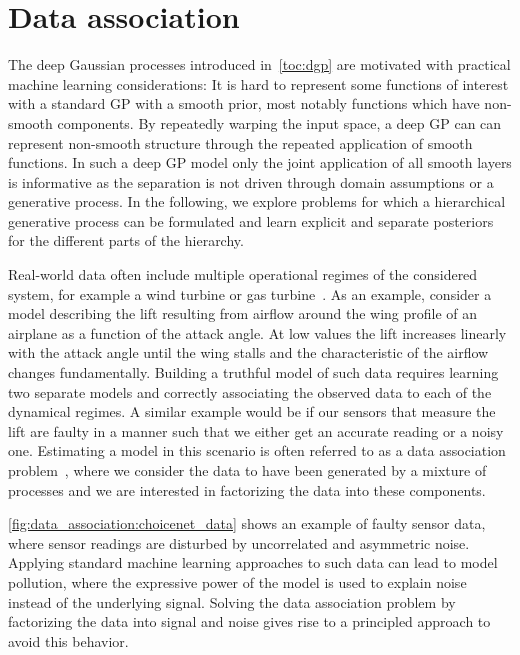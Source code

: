 \chapter{Data association}
\label{toc:data_association}
The deep Gaussian processes introduced in~\cref{toc:dgp} are motivated with practical machine learning considerations:
It is hard to represent some functions of interest with a standard GP with a smooth prior, most notably functions which have non-smooth components.
By repeatedly warping the input space, a deep GP can can represent non-smooth structure through the repeated application of smooth functions.
In such a deep GP model only the joint application of all smooth layers is informative as the separation is not driven through domain assumptions or a generative process.
In the following, we explore problems for which a hierarchical generative process can be formulated and learn explicit and separate posteriors for the different parts of the hierarchy.

Real-world data often include multiple operational regimes of the considered system, for example a wind turbine or gas turbine~\parencite{hein_benchmark_2017}.
As an example, consider a model describing the lift resulting from airflow around the wing profile of an airplane as a function of the attack angle.
At low values the lift increases linearly with the attack angle until the wing stalls and the characteristic of the airflow changes fundamentally.
Building a truthful model of such data requires learning two separate models and correctly associating the observed data to each of the dynamical regimes.
A similar example would be if our sensors that measure the lift are faulty in a manner such that we either get an accurate reading or a noisy one.
Estimating a model in this scenario is often referred to as a data association problem~\parencite{barshalom_tracking_1990,cox_review_1993}, where we consider the data to have been generated by a mixture of processes and we are interested in factorizing the data into these components.

\cref{fig:data_association:choicenet_data} shows an example of faulty sensor data, where sensor readings are disturbed by uncorrelated and asymmetric noise.
Applying standard machine learning approaches to such data can lead to model pollution, where the expressive power of the model is used to explain noise instead of the underlying signal.
Solving the data association problem by factorizing the data into signal and noise gives rise to a principled approach to avoid this behavior.

